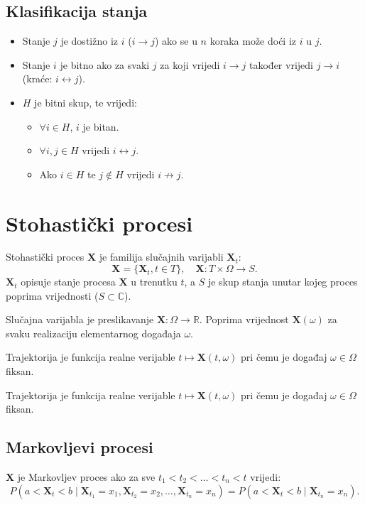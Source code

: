 \documentclass[12pt,english]{article}
\begin{document}
\subsection{Klasifikacija stanja}
\begin{itemize}
  \item Stanje $j$ je dostižno iz $i$ ($i \rightarrow j$) ako se u $n$ koraka može doći iz $i$ u $j$.
  \item Stanje $i$ je bitno ako za svaki $j$ za koji vrijedi $i \rightarrow j$ također vrijedi $j \rightarrow i$ (kraće: $i \leftrightarrow j$).
  \item $H$ je bitni skup, te vrijedi:
  \begin{itemize}
    \item $\forall i \in H$, $i$ je bitan.
    \item $\forall i,j \in H$ vrijedi $i \leftrightarrow j$.
    \item Ako $i \in H$ te $j \not\in H$ vrijedi $i \not\rightarrow j$.
  \end{itemize}
\end{itemize}

\section{Stohastički procesi}
Stohastički proces $\mathbf X$ je familija slučajnih varijabli $\mathbf X_t$:
$$\mathbf X = \{\mathbf X_t, t \in T\},\quad \mathbf X : T \times \Omega \rightarrow S.$$
$\mathbf X_t$ opisuje stanje procesa $\mathbf X$ u trenutku $t$, a $S$ je skup stanja unutar kojeg proces poprima vrijednosti ($S \subset \mathbb C$).

Slučajna varijabla je preslikavanje $\mathbf X : \Omega \rightarrow \mathbb R$. Poprima vrijednost $\mathbf X(\omega)$ za svaku realizaciju elementarnog događaja $\omega$.

Trajektorija je funkcija realne verijable $t \mapsto \mathbf X(t,\omega)$ pri čemu je događaj $\omega \in \Omega$ fiksan.

Trajektorija je funkcija realne verijable $t \mapsto \mathbf X(t,\omega)$ pri čemu je događaj $\omega \in \Omega$ fiksan.

\subsection{Markovljevi procesi}
$\mathbf X$ je Markovljev proces ako za sve $t_1 < t_2 < \ldots < t_n < t$ vrijedi:
$$P(a<\mathbf X_t < b \;\vert\; \mathbf X_{t_1} = x_1, \mathbf X_{t_2} = x_2, \ldots, \mathbf X_{t_n} = x_n) = P(a < \mathbf X_t < b \;\vert\; \mathbf X_{t_n} = x_n).$$
\end{document}

